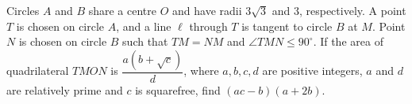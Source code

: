 Circles $A$ and $B$ share a centre $O$ and have radii $3\sqrt3$ and $3$, respectively. A point $T$ is chosen on circle $A$, and a line $\ell$ through $T$ is tangent to circle $B$ at $M$. Point $N$ is chosen on circle $B$ such that $TM=NM$ and $\angle TMN\le90^\circ$. If the area of quadrilateral $TMON$ is $\dfrac{a(b+\sqrt c)}{d}$, where $a,b,c,d$ are positive integers, $a$ and $d$ are relatively prime and $c$ is squarefree, find $(ac-b)(a+2b)$.
